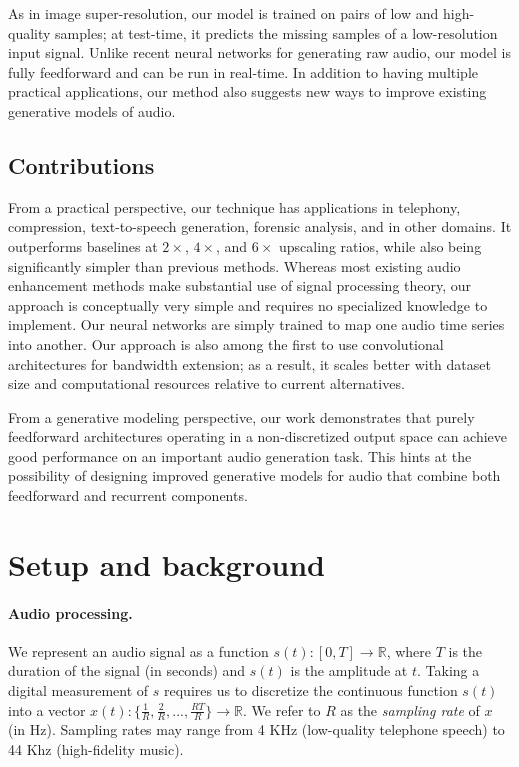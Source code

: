 \documentclass{article} \usepackage{iclr2017_workshop,times}
\begin{document}
As in image super-resolution, our model is trained on pairs of low and high-quality samples; at test-time, it predicts the missing samples of a low-resolution input signal. Unlike recent neural networks for generating raw audio, our model is fully feedforward and can be run in real-time. In addition to having multiple practical applications, our method also suggests new ways to improve existing generative models of audio.

\subsection{Contributions}



From a practical perspective, our technique has applications in telephony, compression, text-to-speech generation, forensic analysis, and in other domains. It outperforms baselines at $2\times$, $4\times$, and $6\times$ upscaling ratios, while also being significantly simpler than previous methods. Whereas most existing audio enhancement methods make substantial use of signal processing theory, our approach is conceptually very simple and requires no specialized knowledge to implement. Our neural networks are simply trained to map one audio time series into another. Our approach is also among the first to use convolutional architectures for bandwidth extension; as a result, it scales better with dataset size and computational resources relative to current alternatives.

From a generative modeling perspective, our work demonstrates that purely feedforward architectures operating in a non-discretized output space can achieve good performance on an important audio generation task. 
This hints at the possibility of designing improved generative models for audio that combine both feedforward and recurrent components.

\section{Setup and background}

\paragraph{Audio processing.} 
We represent an audio signal as a function $s(t) : [0,T] \to \mathbb{R}$, where $T$ is the duration of the signal (in seconds) and $s(t)$ is the amplitude at $t$. Taking a digital measurement of $s$ requires us to discretize the continuous function $s(t)$ into a vector $x(t) :  \{\frac{1}{R}, \frac{2}{R},..., \frac{RT}{R}\} \to \mathbb{R}$. We refer to $R$ as the {\em sampling rate} of $x$ (in Hz). Sampling rates may range from 4 KHz (low-quality telephone speech) to 44 Khz (high-fidelity music).
\end{document}
